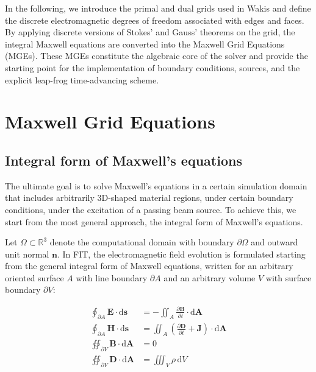 In the following, we introduce the primal and dual grids used in Wakis and define the discrete electromagnetic degrees of freedom associated with edges and faces. By applying discrete versions of Stokes' and Gauss' theorems on the grid, the integral Maxwell equations are converted into the Maxwell Grid Equations (MGEs). These MGEs constitute the algebraic core of the solver and provide the starting point for the implementation of boundary conditions, sources, and the explicit leap-frog time-advancing scheme.

\newpage 

\section{Maxwell Grid Equations}
\label{sec:mge}

\subsection{Integral form of Maxwell's equations}
\label{sec:mge_integral}

The ultimate goal is to solve Maxwell's equations in a certain simulation domain that includes arbitrarily 3D-shaped material regions, under certain boundary conditions, under the excitation of a passing beam source. To achieve this, we start from the most general approach, the integral form of Maxwell's equations.

Let $\Omega \subset \mathbb{R}^3$ denote the computational domain with boundary $\partial\Omega$ and outward unit normal $\mathbf{n}$. In FIT, the electromagnetic field evolution is formulated starting from the general integral form of Maxwell equations, written for an arbitrary oriented surface $A$ with line boundary $\partial A$ and an arbitrary volume $V$ with surface boundary $\partial V$:

\begin{align}
\oint_{\partial A} \mathbf{E}\cdot \mathrm{d}\mathbf{s} &= -\iint_{A}\frac{\partial \mathbf{B}}{\partial t}\cdot \mathrm{d}\mathbf{A} \label{eq:Maxwell:a}\\[6pt]
\oint_{\partial A} \mathbf{H}\cdot \mathrm{d}\mathbf{s} &= \iint_{A}\left(\frac{\partial \mathbf{D}}{\partial t} + \mathbf{J}\right)\cdot \mathrm{d}\mathbf{A} \label{eq:Maxwell:b}\\[6pt]
\oiint_{\partial V} \mathbf{B}\cdot \mathrm{d}\mathbf{A} &= 0 \label{eq:Maxwell:c}\\[6pt]
\oiint_{\partial V} \mathbf{D}\cdot \mathrm{d}\mathbf{A} &= \iiint_{V}\rho\, \mathrm{d}V \label{eq:Maxwell:d}
\end{align}

